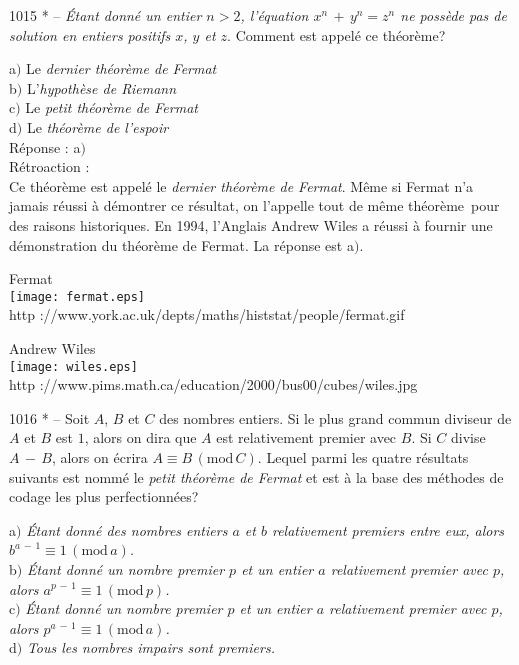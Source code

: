 ﻿\documentclass[letterpaper, 12pt]{article}
\begin{document}
1015 * -- {\sl \'Etant donn\'e un entier $n>2$, l'\'equation
$x^n\,+\,y^n=z^n$ ne poss\`ede pas de solution en entiers positifs
$x$, $y$ et $z$}. Comment est appel\'e ce th\'eor\`eme?

a$)$ Le {\sl dernier th\'eor\`eme de Fermat} \\
b$)$ L'{\sl hypoth\`ese de Riemann} \\
c$)$ Le {\sl petit th\'eor\`eme de Fermat} \\
d$)$ Le {\sl th\'eor\`eme de l'espoir}\\

R\'eponse : a$)$\\

R\'etroaction : \\
Ce th\'eor\`eme est appel\'e le {\sl dernier th\'eor\`eme de
Fermat}. M\^eme si Fermat n'a jamais r\'eussi \`a d\'emontrer ce
r\'esultat, on l'appelle tout de m\^eme \og th\'eor\`eme\fg\ pour
des raisons historiques. En 1994, l'Anglais Andrew Wiles a r\'eussi
\`a fournir une d\'emonstration du th\'eor\`eme de Fermat.
La r\'eponse est a$)$.\\

        \begin{center}
        Fermat\\
    \texttt{[image: fermat.eps]}\\
        {\footnotesize http
://www.york.ac.uk/depts/maths/histstat/people/fermat.gif}
    \end{center}

        \begin{center}
        Andrew Wiles\\
    \texttt{[image: wiles.eps]}\\
        {\footnotesize http
://www.pims.math.ca/education/2000/bus00/cubes/wiles.jpg}
    \end{center}

1016 * -- Soit $A$, $B$ et $C$ des nombres entiers. Si le plus grand
commun diviseur de $A$ et $B$ est $1$, alors on dira que $A$ est
relativement premier avec $B$. Si $C$ divise $A\,-\,B$, alors on
\'ecrira $A\equiv B\,(\mathrm{mod}\,C)$. Lequel parmi les quatre
r\'esultats suivants est nomm\'e le {\sl petit th\'eor\`eme de
Fermat} et est \`a la base des m\'ethodes de codage les plus
perfectionn\'ees?

a$)$ {\sl \'Etant donn\'e des nombres entiers $a$ et $b$ relativement
premiers entre eux, alors $b^{a\,-\,1}\equiv1\,(\mathrm{mod}\,a)$.} \\
b$)$ {\sl \'Etant donn\'e un nombre premier $p$ et un entier $a$
relativement premier avec $p$, alors
$a^{p\,-\,1}\equiv1\,(\mathrm{mod}\,p)$.} \\
c$)$ {\sl \'Etant donn\'e un nombre premier $p$ et un entier $a$
relativement premier avec $p$, alors
$p^{a\,-\,1}\equiv1\,(\mathrm{mod}\,a)$.} \\
d$)$ {\sl Tous les nombres impairs sont premiers.}\\
\end{document}
